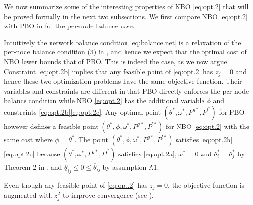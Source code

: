  


We now summarize some of the interesting properties of NBO \eqref{eq:opt.2}
that will be proved formally in the next two subsections.  
We first compare NBO \eqref{eq:opt.2} with PBO in \cite{Wang:DistributedFrequency} for
the per-node balance case.
\begin{remark}
        \bee
        \item  Intuitively the network balance condition \eqref{eq:balance.net} is a relaxation 
        of the per-node balance condition (3) in \cite{Wang:DistributedFrequency}, and hence we
        expect that the optimal cost of NBO lower bounds that of PBO.   This is indeed the case, as we now argue.
		Constraint \eqref{eq:opt.2b} implies that any
        feasible point of \eqref{eq:opt.2} has $z_j=0$ and hence these two optimization
        problems have the same objective function.  
        Their variables and constraints 
        are different in that  PBO directly enforces the per-node balance  
        condition while NBO \eqref{eq:opt.2} has the additional 
        variable $\phi$ and constraints \eqref{eq:opt.2b}\eqref{eq:opt.2c}.
        Any optimal point $(\theta^*, \omega^*, P^{g*}, P^{l^*})$ for PBO
        however defines a feasible point $(\theta^*, \phi, \omega^*, P^{g*}, P^{l*})$ 
        for NBO \eqref{eq:opt.2} with the same cost where $\phi=\theta^*$.
        The point $(\theta^*, \phi, \omega^*, P^{g*}, P^{l*})$ satisfies 
        \eqref{eq:opt.2b}\eqref{eq:opt.2c} 
        because $(\theta^*, \omega^*, P^{g*}, P^{l^*})$ satisfies \eqref{eq:opt.2a},
        $\omega^*=0$ and $\theta^*_i = \theta^*_j$ by Theorem 2 in \cite{Wang:DistributedFrequency}, and
        $\underline{\theta}_{ij} \leq 0 \leq \overline{\theta}_{ij}$ by assumption A1.
     
        \item
        Even though any feasible point of \eqref{eq:opt.2} has $z_j=0$, the 
        objective function is augmented with $z_j^2$ to improve convergence 
        (see \cite{Feijer:Stability}).         
        \eee
\end{remark}

